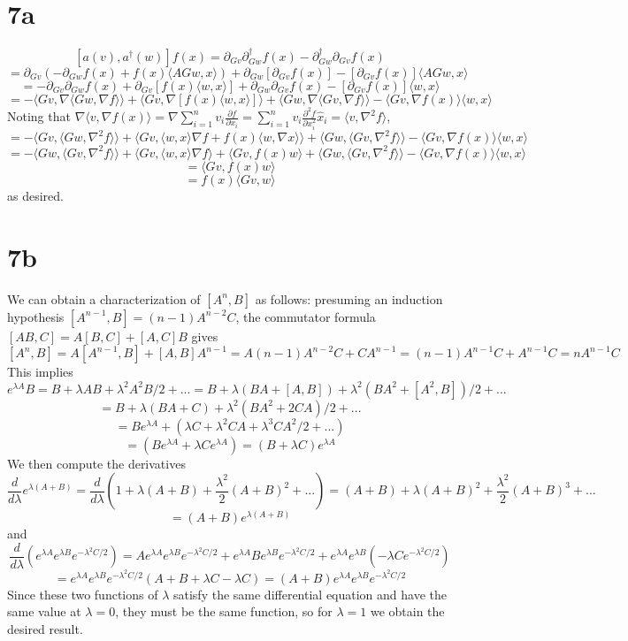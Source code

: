 \documentclass{article}
\begin{document}
\section*{7a}
\[
  [a(v), a^{\dagger}(w)]f(x)
  =\partial_{Gv}\partial_{Gw}^{\dagger}f(x)-\partial^{\dagger}_{Gw}\partial_{Gv}f(x)
\]
\[
  =\partial_{Gv}\left( -\partial_{Gw}f(x)+f(x)\langle AGw,x \rangle \right)
  +\partial_{Gw}[\partial_{Gv}f(x)]-[\partial_{Gv}f(x)]\langle AGw,x  \rangle
\]
\[
  =-\partial_{Gv}\partial_{Gw}f(x)+\partial_{Gv}[f(x)\langle w,x\rangle]+\partial_{Gw}\partial_{Gv}f(x)-[\partial_{Gv}f(x)]\langle w,x \rangle
\]
\[
  =-\langle Gv,\nabla\langle Gw,\nabla f \rangle \rangle+\langle Gv,\nabla[f(x)\langle w,x \rangle] \rangle
  +\langle Gw,\nabla\langle Gv,\nabla f \rangle \rangle-\langle Gv,\nabla f(x)\rangle\langle w,x \rangle
\]
Noting that $\nabla\langle v,\nabla f(x) \rangle=\nabla\sum_{i=1}^{n}v_{i}\frac{\partial f}{\partial x_{i}}
=\sum_{i=1}^{n}v_{i}\frac{\partial^{2}f}{\partial x_{i}^{2}}\hat{x}_{i}=\langle v,\nabla^{2}f \rangle$,
\[
  =-\langle Gv,\langle Gw,\nabla^{2}f \rangle \rangle+\langle Gv,\langle w,x \rangle\nabla f+f(x)\langle w,\nabla x \rangle \rangle
  +\langle Gw,\langle Gv,\nabla^{2}f \rangle \rangle-\langle Gv,\nabla f(x)\rangle\langle w,x \rangle
\]
\[
  =-\langle Gw,\langle Gv,\nabla^{2}f \rangle  \rangle+\langle Gv,\langle w,x \rangle\nabla f \rangle+\langle Gv,f(x)w \rangle
  +\langle Gw,\langle Gv,\nabla^{2}f \rangle \rangle-\langle Gv,\nabla f(x)\rangle\langle w,x \rangle
\]
\[
  =\langle Gv,f(x)w \rangle
\]
\[
  =f(x)\langle Gv,w \rangle
\]
as desired.
\section*{7b}
We can obtain a characterization of $[A^{n},B]$ as follows:
presuming an induction hypothesis $[A^{n-1},B]=(n-1)A^{n-2}C$, the commutator formula $[AB,C]=A[B,C]+[A,C]B$ gives
\[
  [A^{n},B]=A[A^{n-1},B]+ [A,B]A^{n-1}
  =A(n-1)A^{n-2}C+CA^{n-1}
  =(n-1)A^{n-1}C+A^{n-1}C
  =nA^{n-1}C
\]
This implies
\[
  e^{\lambda A}B
  =B+\lambda AB+\lambda^{2} A^{2}B/2+...
  =B+\lambda\left( BA+[A,B] \right)+\lambda^{2}(BA^{2}+[A^{2},B])/2+...
\]
\[
  =B+\lambda\left( BA+C \right)+\lambda^{2}\left( BA^{2} +2CA\right)/2+...
\]
\[
  =Be^{\lambda A}+\left( \lambda C+ \lambda^{2}CA+\lambda^{3}CA^{2}/2+... \right)
\]
\[
  =(Be^{\lambda A}+\lambda C e^{\lambda A})=(B+\lambda C)e^{\lambda A}
\]
We then compute the derivatives
\[
  \frac{d}{d\lambda}e^{\lambda (A+B)}=\frac{d}{d\lambda}\left(  1+\lambda(A+B)+\frac{\lambda^{2}}{2}(A+B)^{2}+...\right)
  =(A+B)+\lambda (A+B)^{2}+\frac{\lambda^{2}}{2}(A+B)^{3}+...
\]
\[
  =(A+B)e^{\lambda(A+B)}
\]
and
\[
  \frac{d}{d\lambda}(e^{\lambda A}e^{\lambda B}e^{-\lambda^{2}C/2})
  =Ae^{\lambda A}e^{\lambda B}e^{-\lambda^{2}C/2}+e^{\lambda A}Be^{\lambda B}e^{-\lambda^{2}C/2}
  +e^{\lambda A}e^{\lambda B}\left( -\lambda Ce^{-\lambda^{2}C/2} \right)
\]
\[
  =e^{\lambda A}e^{\lambda B}e^{-\lambda^{2}C/2}\left( A+B+\lambda C-\lambda C \right)
  =(A+B)e^{\lambda A}e^{\lambda B}e^{-\lambda^{2}C/2}
\]
Since these two functions of $\lambda$ satisfy the same differential equation and have the same value at $\lambda=0$,
they must be the same function, so for $\lambda=1$ we obtain the desired result.
\end{document}
